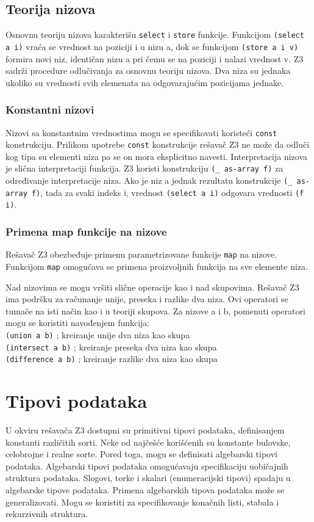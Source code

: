 \documentclass[12pt,oneside]{memoir}
\begin{document}
\subsection{Teorija nizova} 
Osnovnu teoriju nizova karakterišu \texttt{select} i \texttt{store} funkcije. 
Funkcijom \texttt{(select a i)} vraća se vrednost na poziciji i u nizu a, dok se funkcijom \texttt{(store a i v)} formira novi niz, identičan nizu a pri čemu se na poziciji i nalazi vrednost v.
Z3 sadrži procedure odlučivanja za osnovnu teoriju nizova.
Dva niza su jednaka ukoliko su vrednosti svih elemenata na odgovarajućim pozicijama jednake.
 

\subsubsection{Konstantni nizovi}

Nizovi sa konstantnim vrednostima mogu se specifikovati koristeći \texttt{const} konstrukciju. Prilikom upotrebe \texttt{const} konstrukcije rešavač Z3 ne može da odluči kog tipa su elementi niza pa se on mora eksplicitno navesti. Interpretacija nizova je slična interpretaciji funkcija. Z3 koristi konstrukciju \texttt{(\_ as-array f)} za određivanje interpretacije niza. Ako je niz a jednak rezultatu konstrukcije \texttt{(\_ as-array f)}, tada za svaki indeks i, vrednost \texttt{(select a i)} odgovara vrednosti \texttt{(f i)}. 


\subsubsection{Primena map funkcije na nizove}
Rešavač Z3 obezbeđuje primenu parametrizovane funkcije \texttt{map} na nizove. Funkcijom \texttt{map} omogućava se primena proizvoljnih funkcija na sve elemente niza.

Nad nizovima se mogu vršiti slične operacije kao i nad skupovima. Rešavač Z3 ima podršku za računanje unije, preseka i razlike dva niza. Ovi operatori se tumače na isti način kao i u teoriji skupova. Za nizove a i b, pomenuti operatori mogu se koristiti navođenjem funkcija:\\
\texttt{(union a b)} ; kreiranje unije dva niza kao skupa \\
\texttt{(intersect a b)} ; kreiranje preseka dva niza kao skupa \\
\texttt{(difference a b)} ; kreiranje razlike dva niza kao skupa

\section{Tipovi podataka} \label{sec:num3}
U okviru rešavača Z3 dostupni su primitivni tipovi podataka, definisanjem konstanti različitih sorti. Neke od najčešće korišćenih su konstante bulovske, celobrojne i realne sorte.
Pored toga, mogu se definisati algebarski tipovi podataka. Algebarski tipovi podataka omogućavaju specifikaciju uobičajnih struktura podataka. Slogovi, torke i skalari (enumeracijski tipovi) spadaju u algebarske tipove podataka. Primena algebarskih tipova podataka može se generalizovati. Mogu se koristiti za specifikovanje konačnih listi, stabala i rekurzivnih struktura. 
\end{document}
